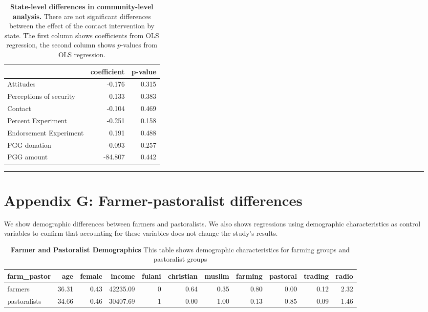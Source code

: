 \documentclass[
]{article}
\begin{document}
\begin{table}[H]
\begin{center}
\label{tab:state_tab}
\caption{\textbf{State-level differences in community-level analysis.} There are not significant differences between the effect of the contact intervention by state. The first column shows coefficients from OLS regression, the second column shows $p$-values from OLS regression.}
\smallskip

\begin{tabular}{l|r|r}
\hline
  & coefficient & p-value\\
\hline
Attitudes & -0.176 & 0.315\\
\hline
Perceptions of security & 0.133 & 0.383\\
\hline
Contact & -0.104 & 0.469\\
\hline
Percent Experiment & -0.251 & 0.158\\
\hline
Endorsement Experiment & 0.191 & 0.488\\
\hline
PGG donation & -0.093 & 0.257\\
\hline
PGG amount & -84.807 & 0.442\\
\hline
\end{tabular}


\end{center}
\end{table}

\begin{center}\rule{0.5\linewidth}{0.5pt}\end{center}

\newpage

\hypertarget{appendix-g-farmer-pastoralist-differences}{%
\section{Appendix G: Farmer-pastoralist
differences}\label{appendix-g-farmer-pastoralist-differences}}

We show demographic differences between farmers and pastoralists. We
also shows regressions using demographic characteristics as control
variables to confirm that accounting for these variables does not change
the study's results.

\begin{table}[H]
\begin{center}
\label{tab:demo_tab_overall1}
\caption{\textbf{Farmer and Pastoralist Demographics} This table shows demographic characteristics for farming groups and pastoralist groups}
\smallskip

\begin{tabular}{l|r|r|r|r|r|r|r|r|r|r}
\hline
farm\_pastor & age & female & income & fulani & christian & muslim & farming & pastoral & trading & radio\\
\hline
farmers & 36.31 & 0.43 & 42235.09 & 0 & 0.64 & 0.35 & 0.80 & 0.00 & 0.12 & 2.32\\
\hline
pastoralists & 34.66 & 0.46 & 30407.69 & 1 & 0.00 & 1.00 & 0.13 & 0.85 & 0.09 & 1.46\\
\hline
\end{tabular}


\end{center}
\end{table}
\end{document}
